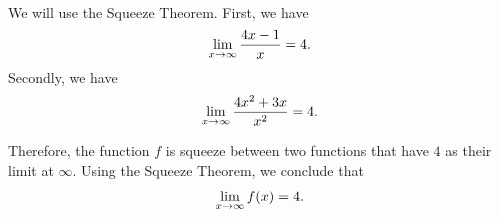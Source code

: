 	\spc
	
	\\
	We will use the Squeeze Theorem. First, we have
		\begin{align*}
		\lim_{x \rightarrow \infty} \frac{4x - 1}{x} = 4 .
		\end{align*}	
	Secondly, we have
		\begin{align*}
		\lim_{x \rightarrow \infty} \frac{4x^2 + 3x}{x^2} = 4 .
		\end{align*}
	
	Therefore, the function $f$ is squeeze between two functions that have $4$ as their limit at $\infty$. Using the Squeeze Theorem, we conclude that 
		\begin{align*}
		\lim_{x \rightarrow \infty} f (x) = 4 .
		\end{align*}	
		
	
